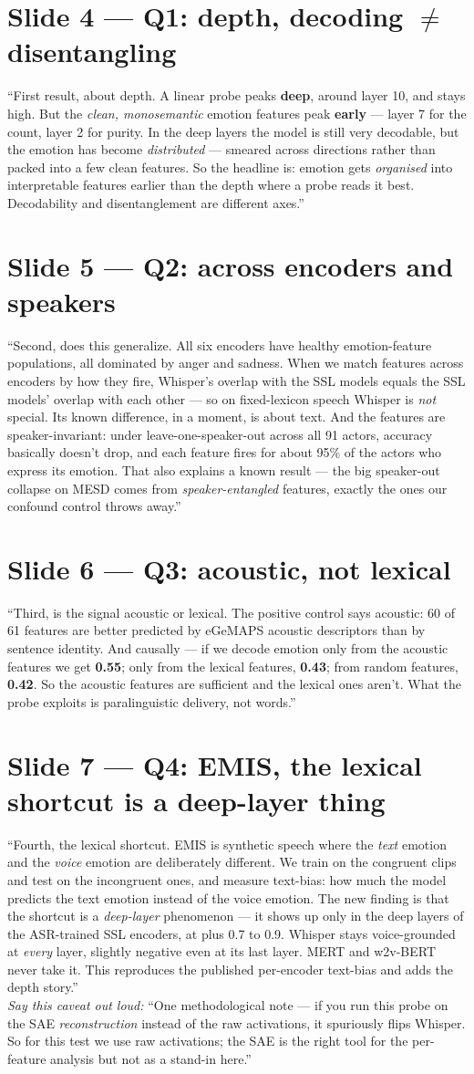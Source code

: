\documentclass[11pt]{article}
\newcommand{\slide}[1]{\section{#1}}
\begin{document}
\slide{Slide 4 --- Q1: depth, decoding $\neq$ disentangling}
``First result, about depth. A linear probe peaks \textbf{deep}, around layer 10, and stays high. But the \emph{clean, monosemantic} emotion features peak \textbf{early} --- layer 7 for the count, layer 2 for purity. In the deep layers the model is still very decodable, but the emotion has become \emph{distributed} --- smeared across directions rather than packed into a few clean features. So the headline is: emotion gets \emph{organised} into interpretable features earlier than the depth where a probe reads it best. Decodability and disentanglement are different axes.''

\slide{Slide 5 --- Q2: across encoders and speakers}
``Second, does this generalize. All six encoders have healthy emotion-feature populations, all dominated by anger and sadness. When we match features across encoders by how they fire, Whisper's overlap with the SSL models equals the SSL models' overlap with each other --- so on fixed-lexicon speech Whisper is \emph{not} special. Its known difference, in a moment, is about text. And the features are speaker-invariant: under leave-one-speaker-out across all 91 actors, accuracy basically doesn't drop, and each feature fires for about 95\% of the actors who express its emotion. That also explains a known result --- the big speaker-out collapse on MESD comes from \emph{speaker-entangled} features, exactly the ones our confound control throws away.''

\slide{Slide 6 --- Q3: acoustic, not lexical}
``Third, is the signal acoustic or lexical. The positive control says acoustic: 60 of 61 features are better predicted by eGeMAPS acoustic descriptors than by sentence identity. And causally --- if we decode emotion only from the acoustic features we get \textbf{0.55}; only from the lexical features, \textbf{0.43}; from random features, \textbf{0.42}. So the acoustic features are sufficient and the lexical ones aren't. What the probe exploits is paralinguistic delivery, not words.''

\slide{Slide 7 --- Q4: EMIS, the lexical shortcut is a deep-layer thing}
``Fourth, the lexical shortcut. EMIS is synthetic speech where the \emph{text} emotion and the \emph{voice} emotion are deliberately different. We train on the congruent clips and test on the incongruent ones, and measure text-bias: how much the model predicts the text emotion instead of the voice emotion. The new finding is that the shortcut is a \emph{deep-layer} phenomenon --- it shows up only in the deep layers of the ASR-trained SSL encoders, at plus 0.7 to 0.9. Whisper stays voice-grounded at \emph{every} layer, slightly negative even at its last layer. MERT and w2v-BERT never take it. This reproduces the published per-encoder text-bias and adds the depth story.''\\
\textit{Say this caveat out loud:} ``One methodological note --- if you run this probe on the SAE \emph{reconstruction} instead of the raw activations, it spuriously flips Whisper. So for this test we use raw activations; the SAE is the right tool for the per-feature analysis but not as a stand-in here.''
\end{document}
